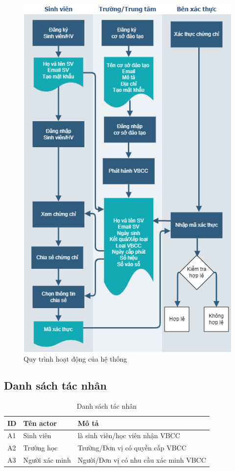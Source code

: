 \begin{figure}[htbp]
\centering
\includegraphics[width=.9\linewidth]{img/vbcc_diagram2.png}
\caption{Quy trình hoạt động của hệ thống}
\label{fig:vbcc_diagram}
\end{figure}

\subsection{Danh sách tác nhân}

\begin{table}[H]
\caption{Danh sách tác nhân}
	\label{table:actor}
	\begin{tabularx} {\textwidth} {|p{1cm}|p{3cm}|X|}
\hline
	ID & Tên actor & Mô tả \\ \hline
	A1 & Sinh viên &  là sinh viên/học viên nhận VBCC \\ \hline
	A2 & Trường học  & Trường/Đơn vị có quyền cấp VBCC \\ \hline
	A3 & Người xác minh  & Người/Đơn vị có nhu cầu xác minh VBCC \\ \hline
\end{tabularx}
\end{table}

